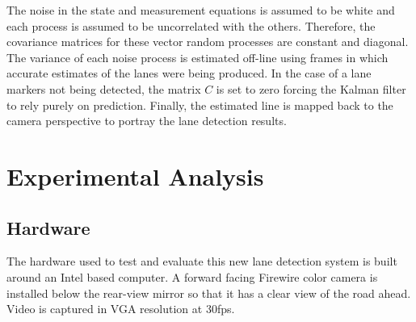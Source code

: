 \documentclass{article}
\begin{document}
The noise in the state and measurement equations is assumed to be white
and each process is assumed to be uncorrelated with the others.
Therefore, the covariance matrices for these vector random processes are
constant and diagonal. The variance of each noise process is estimated
 off-line using frames in which accurate estimates
of the lanes were being produced.
In the case of a lane markers not being detected, the matrix $C$ is set to zero
forcing the Kalman filter to rely purely on prediction. Finally, the estimated line is mapped back to the camera perspective to portray the lane detection results.

\section{Experimental Analysis}
\label{sec:exp_ana}
\subsection{Hardware}
The hardware used to test and evaluate this new lane detection system is built around an Intel based computer.  A forward facing Firewire color camera is installed below the rear-view mirror so that it has a clear view of the road ahead. Video is captured in VGA resolution at 30fps.
\end{document}

